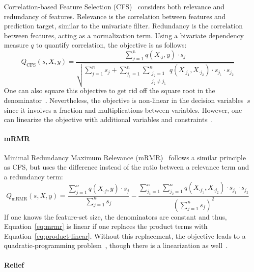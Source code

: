\documentclass{article}
\theoremstyle{definition}
\begin{document}
Correlation-based Feature Selection (CFS)~\cite{hall1999correlation, hall2000correlation} considers both relevance and redundancy of features.
Relevance is the correlation between features and prediction target, similar to the univariate filter.
Redundancy is the correlation between features, acting as a normalization term.
Using a bivariate dependency measure $q$ to quantify correlation, the objective is as follows:
%
\begin{equation}
	Q_{\text{CFS}}(s,X,y) = \frac{\sum_{j=1}^{n} q(X_{\cdot{}j},y) \cdot s_j}{\sqrt{\sum_{j=1}^{n} s_j + \sum_{j_1=1}^{n} \sum_{\substack{j_2=1 \\ j_2 \neq j_1}}^{n} q(X_{\cdot{}j_1}, X_{\cdot{}j_2}) \cdot s_{j_1} \cdot s_{j_2}}}
	\label{eq:cfs}
\end{equation}
%
One can also square this objective to get rid off the square root in the denominator~\cite{nguyen2010towards}.
Nevertheless, the objective is non-linear in the decision variables~$s$ since it involves a fraction and multiplications between variables.
However, one can linearize the objective with additional variables and constraints~\cite{nguyen2010improving, nguyen2010towards}.

\paragraph{mRMR}

Minimal Redundancy Maximum Relevance (mRMR)~\cite{peng2005feature} follows a similar principle as CFS, but uses the difference instead of the ratio between a relevance term and a redundancy term:
%
\begin{equation}
	Q_{\text{mRMR}}(s,X,y) = \frac{\sum_{j=1}^{n} q(X_{\cdot{}j},y) \cdot s_j}{\sum_{j=1}^{n} s_j} - \frac{\sum_{j_1=1}^{n} \sum_{j_2=1}^{n} q(X_{\cdot{}j_1}, X_{\cdot{}j_2}) \cdot s_{j_1} \cdot s_{j_2}}{(\sum_{j=1}^{n} s_j)^2}
	\label{eq:mrmr}
\end{equation}
%
If one knows the feature-set size, the denominators are constant and thus, Equation~\ref{eq:mrmr} is linear if one replaces the product terms with Equation~\ref{eq:product-linear}.
Without this replacement, the objective leads to a quadratic-programming problem~\cite{nguyen2014effective, rodriguez2010quadratic}, though there is a linearization as well~\cite{nguyen2009optimizing, nguyen2010towards}.

\paragraph{Relief}
\end{document}
